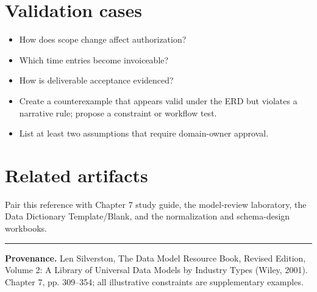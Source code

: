 \documentclass[11pt,letterpaper]{article}
\begin{document}
\section{Validation cases}
\begin{itemize}
\item How does scope change affect authorization?
\item Which time entries become invoiceable?
\item How is deliverable acceptance evidenced?
\item Create a counterexample that appears valid under the ERD but violates a narrative rule; propose a constraint or workflow test.
\item List at least two assumptions that require domain-owner approval.
\end{itemize}

\section{Related artifacts}
Pair this reference with Chapter 7 study guide, the model-review laboratory, the Data Dictionary Template/Blank, and the normalization and schema-design workbooks.


\vfill
\hrule
{\footnotesize\textbf{Provenance.} Len Silverston, The Data Model Resource Book, Revised Edition, Volume 2: A Library of Universal Data Models by Industry Types (Wiley, 2001). Chapter 7, pp. 309--354; all illustrative constraints are supplementary examples.}
\end{document}
